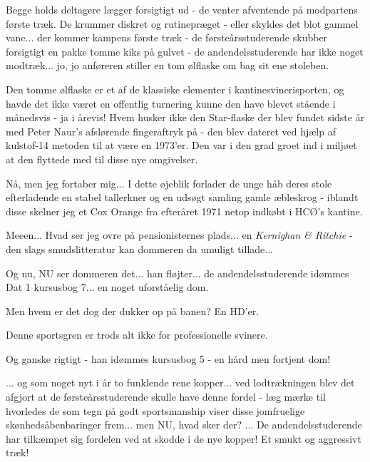 \documentclass[a4paper,11pt]{article}
\begin{document}
\begin{sketch}

   Begge holds deltagere lægger forsigtigt ud - de venter
  afventende på modpartens første træk.  De krummer diskret og
  rutinepræget - eller skyldes det blot gammel vane... der kommer
  kampens første træk - de førsteårsstuderende skubber forsigtigt en
  pakke tomme kiks på gulvet - de andendelsstuderende har ikke noget
  modtræk... jo, jo anføreren stiller en tom ølflaske om bag sit ene
  stoleben.

   Den tomme ølflaske er et af de klassiske elementer i
  kantinesvinerisporten, og havde det ikke været en offentlig
  turnering kunne den have blevet stående i månedsvis - ja i årevis!
  Hvem husker ikke den Star-flaske der blev fundet sidste år med Peter
  Naur's afslørende fingeraftryk på - den blev dateret ved hjælp af
  kulstof-14 metoden til at være en 1973'er.  Den var i den grad groet
  ind i miljøet at den flyttede med til disse nye omgivelser.

   Nå, men jeg fortaber mig... I dette øjeblik forlader de
  unge håb deres stole efterladende en stabel tallerkner og en udsøgt
  samling gamle æbleskrog - iblandt disse skelner jeg et Cox Orange
  fra efteråret 1971 netop indkøbt i HCØ's kantine.

   Meeen... Hvad ser jeg ovre på pensionisternes plads... en
  {\em Kernighan \& Ritchie} - den slags smudslitteratur kan dommeren
  da umuligt tillade...

  Og nu, NU ser dommeren det... han fløjter... de andendelsstuderende
  idømmes Dat 1 kursusbog 7... en noget uforståelig dom.

   Men hvem er det dog der dukker op på banen?  En HD'er.


   Denne sportsgren er trods alt ikke for professionelle
  svinere.


   Og ganske rigtigt - han idømmes kursusbog 5 - en hård men
  fortjent dom!

   ... og som noget nyt i år to funklende rene kopper... ved
  lodtrækningen blev det afgjort at de førsteårsstuderende skulle have
  denne fordel - læg mærke til hvorledes de som tegn på godt
  sportsmanship viser disse jomfruelige skønhedsåbenbaringer
  frem... men NU, hvad sker der?  ... De andendelsstuderende har
  tilkæmpet sig fordelen ved at skodde i de nye kopper!  Et smukt og
  aggressivt træk!


\end{sketch}
\end{document}
